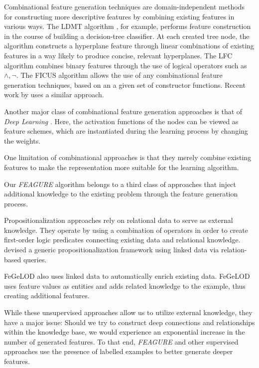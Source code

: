 \documentclass[twoside,11pt]{article}
\theoremstyle{definition}
\begin{document}
Combinational feature generation techniques are domain-independent methods for constructing more descriptive features by combining existing features in various ways. The LDMT algorithm \cite{utgo1991linear}, for example, performs feature construction in the course of building a decision-tree classifier. At each created tree node, the algorithm constructs a hyperplane feature through linear combinations of existing features in a way likely to produce concise, relevant hyperplanes. The LFC algorithm \cite{ragavan1993complex} combines binary features through the use of logical operators such as $\land ,\lnot$.
The FICUS algorithm \cite{markovitch2002feature} allows the use of any combinational feature generation techniques, based on an a given set of constructor functions. Recent work by \cite{katz2016explorekit} uses a similar approach.

Another major class of combinational feature generation approaches is that of \emph{Deep Learning} \cite{rumelhart1986learning,lecun1998gradient}. Here, the  activation functions of the nodes can be viewed as feature schemes, which are instantiated during the learning process by changing the weights.

One limitation of combinational approaches is that they merely combine existing features to make the representation more suitable for the 
learning algorithm. 

Our \emph{FEAGURE} algorithm belongs to a third class of approaches that inject additional knowledge to the existing problem through the feature generation process.
	
	 Propositionalization approaches \cite{kramer2000bottom,cheng2011automatedfull} rely on relational data to serve as external knowledge. They operate by using a combination of operators in order to create first-order logic predicates connecting existing data and relational knowledge. 
	\cite{cheng2011automatedfull} devised a generic propositionalization framework  using linked data via relation-based queries. 
	
	 FeGeLOD \cite{paulheim2012unsupervisedfull} also uses linked data to automatically enrich existing data. 
	FeGeLOD uses feature values as entities and adds related knowledge to the example, thus creating additional features. 
	
	While these unsupervised approaches allow us to utilize external knowledge, they have a major issue: Should we try to construct deep connections and relationships within the knowledge base, we would experience an exponential increase in the number of generated features.
	To that end, \emph{FEAGURE} and other supervised approaches use the presence of labelled examples to better generate deeper features.
	
\end{document}
